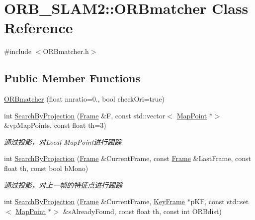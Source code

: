 \hypertarget{class_o_r_b___s_l_a_m2_1_1_o_r_bmatcher}{}\section{O\+R\+B\+\_\+\+S\+L\+A\+M2\+:\+:O\+R\+Bmatcher Class Reference}
\label{class_o_r_b___s_l_a_m2_1_1_o_r_bmatcher}


{\ttfamily \#include $<$O\+R\+Bmatcher.\+h$>$}

\subsection*{Public Member Functions}
\begin{DoxyCompactItemize}
\item 
\mbox{\hyperlink{class_o_r_b___s_l_a_m2_1_1_o_r_bmatcher_a6ca536b80e44da0f56fcd35ff8c6a833}{O\+R\+Bmatcher}} (float nnratio=0., bool check\+Ori=true)
\item 
int \mbox{\hyperlink{class_o_r_b___s_l_a_m2_1_1_o_r_bmatcher_ae43d042858a3a3ca4238bb4ca519f196}{Search\+By\+Projection}} (\mbox{\hyperlink{class_o_r_b___s_l_a_m2_1_1_frame}{Frame}} \&F, const std\+::vector$<$ \mbox{\hyperlink{class_o_r_b___s_l_a_m2_1_1_map_point}{Map\+Point}} $\ast$$>$ \&vp\+Map\+Points, const float th=3)
\begin{DoxyCompactList}\small\item\em 通过投影，对\+Local Map\+Point进行跟踪 \end{DoxyCompactList}\item 
int \mbox{\hyperlink{class_o_r_b___s_l_a_m2_1_1_o_r_bmatcher_a0dba0b2bed7d16ca56e27ff4df00f557}{Search\+By\+Projection}} (\mbox{\hyperlink{class_o_r_b___s_l_a_m2_1_1_frame}{Frame}} \&Current\+Frame, const \mbox{\hyperlink{class_o_r_b___s_l_a_m2_1_1_frame}{Frame}} \&Last\+Frame, const float th, const bool b\+Mono)
\begin{DoxyCompactList}\small\item\em 通过投影，对上一帧的特征点进行跟踪 \end{DoxyCompactList}\item 
int \mbox{\hyperlink{class_o_r_b___s_l_a_m2_1_1_o_r_bmatcher_af83a014848a63b5a3b3086386f7a865e}{Search\+By\+Projection}} (\mbox{\hyperlink{class_o_r_b___s_l_a_m2_1_1_frame}{Frame}} \&Current\+Frame, \mbox{\hyperlink{class_o_r_b___s_l_a_m2_1_1_key_frame}{Key\+Frame}} $\ast$p\+KF, const std\+::set$<$ \mbox{\hyperlink{class_o_r_b___s_l_a_m2_1_1_map_point}{Map\+Point}} $\ast$$>$ \&s\+Already\+Found, const float th, const int O\+R\+Bdist)

\end{DoxyCompactItemize}
